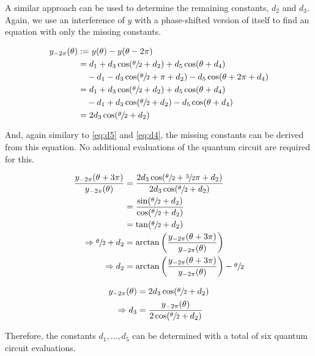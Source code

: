 A similar approach can be used to determine the remaining constants, $d_2$ and
$d_3$.
Again, we use an interference of $y$ with a phase-shifted version of itself to
find an equation with only the missing constants.

\begin{equation}
    \label{eq:y-2pi}
    \begin{split}
        y_{-2\pi}(\theta)
            &:= y(\theta) - y(\theta - 2\pi) \\
            &= d_1 + d_3 \cos(\sfrac\theta2 + d_2) + d_5 \cos(\theta + d_4) \\
                &\quad - d_1 - d_3 \cos(\sfrac\theta2 + \pi + d_2) - d_5 \cos(\theta + 2\pi + d_4) \\
            &= d_1 + d_3 \cos(\sfrac\theta2 + d_2) + d_5 \cos(\theta + d_4) \\
                &\quad - d_1 + d_3 \cos(\sfrac\theta2 + d_2) - d_5 \cos(\theta + d_4) \\
            &= 2 d_3 \cos(\sfrac\theta2 + d_2)
    \end{split}
\end{equation}

And, again similary to \ref{eq:d5} and \ref{eq:d4}, the missing constants can be
derived from this equation.
No additional evaluations of the quantum circuit are required for this.

\begin{equation}
    \label{eq:d2}
    \begin{split}
        \frac{y_{-2\pi}(\theta + 3\pi)}{y_{-2\pi}(\theta)}
            &= \frac{2 d_3 \cos(\sfrac\theta2 + \sfrac32 \pi + d_2)}{2 d_3 \cos(\sfrac\theta2 + d_2)} \\
            &= \frac{\sin(\sfrac\theta2 + d_2)}{\cos(\sfrac\theta2 + d_2)} \\
            &= \tan(\sfrac\theta2 + d_2) \\
        \Rightarrow \sfrac\theta2 + d_2
            &= \arctan\left(\frac{y_{-2\pi}(\theta + 3\pi)}{y_{-2\pi}(\theta)}\right) \\
        \Rightarrow d_2
            &= \arctan\left(\frac{y_{-2\pi}(\theta + 3\pi)}{y_{-2\pi}(\theta)}\right) - \sfrac\theta2
    \end{split}
\end{equation}

\begin{equation}
    \label{eq:d3}
    \begin{split}
        y_{-2\pi}(\theta) &= 2 d_3 \cos(\sfrac\theta2 + d_2) \\
        \Rightarrow d_3 &= \frac{y_{-2\pi}(\theta)}{2 \cos(\sfrac\theta2 + d_2)}
    \end{split}
\end{equation}

Therefore, the constants $d_1, \dots, d_5$ can be determined with a total of six
quantum circuit evaluations.
